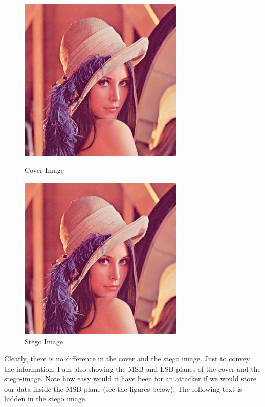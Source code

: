 \documentclass{report}
\begin{document}
\begin{figure}[H]
\centering
\begin{minipage}{0.46\linewidth}
\centering
\includegraphics[width=0.7\textwidth]{images/lenna.png}
\caption{Cover Image}
\end{minipage}
\hfill
\begin{minipage}{0.46\linewidth}
\centering
\includegraphics[width=0.7\textwidth]{images/stego-lenna.png}
\caption{Stego Image}
\end{minipage}
\end{figure}
Clearly, there is no difference in the cover and the stego image. Just to convey the information, I am also showing the MSB and LSB planes of the cover and the stego-image. Note how easy would it have been for an attacker if we would store our data inside the MSB plane (see the figures below). The following text is hidden in the stego image.
\end{document}
